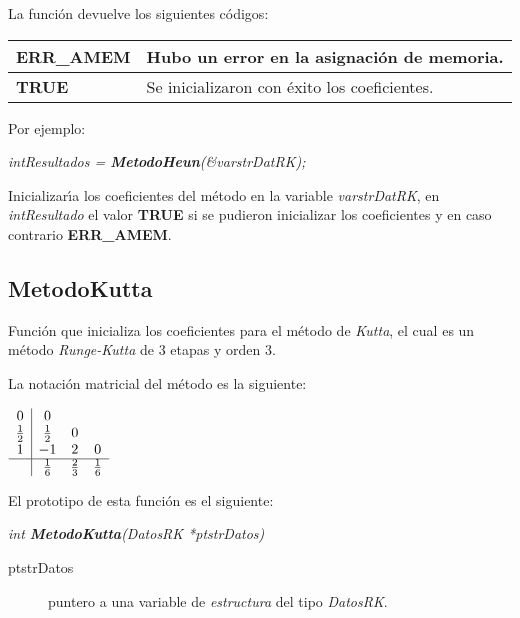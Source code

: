 La funci\'on devuelve los siguientes c\'odigos:

\begin{center}
\begin{tabular}{|l|l|}
\hline
\textbf{ERR\_AMEM} & Hubo un error en la asignaci\'on de memoria. \\
\hline
\textbf{TRUE} & Se inicializaron con \'exito los coeficientes. \\
\hline
\end{tabular}
\end{center}

Por ejemplo:

\begin{center}
\emph{intResultados = \textbf{MetodoHeun}(\&varstrDatRK);}
\end{center}

Inicializar\'{\i}a los coeficientes del m\'etodo en la variable
\emph{varstrDatRK}, en \emph{intResultado} el valor \textbf{TRUE} si se pudieron
inicializar los coeficientes y en caso contrario \textbf{ERR\_AMEM}.

\subsection{MetodoKutta}

Funci\'on que inicializa los coeficientes para el m\'etodo de \emph{Kutta}, el
cual es un m\'etodo \emph{Runge-Kutta} de $3$ etapas y orden $3$.\newline

La notaci\'on matricial del m\'etodo es la siguiente:

\begin{center}
$
\begin{array}{c|ccc}
0 & 0 \\
\frac{1}{2} & \frac{1}{2} & 0 \\
1 & -1 & 2 & 0 \\
\hline
 & \frac{1}{6} & \frac{2}{3} & \frac{1}{6}
\end{array}
$
\end{center}

El prototipo de esta funci\'on es el siguiente:

\begin{center}
\emph{int \textbf{MetodoKutta}(DatosRK *ptstrDatos)}
\end{center}

\begin{description}
\item[ptstrDatos] puntero a una variable de \emph{estructura} del tipo
\emph{DatosRK}.
\end{description}

